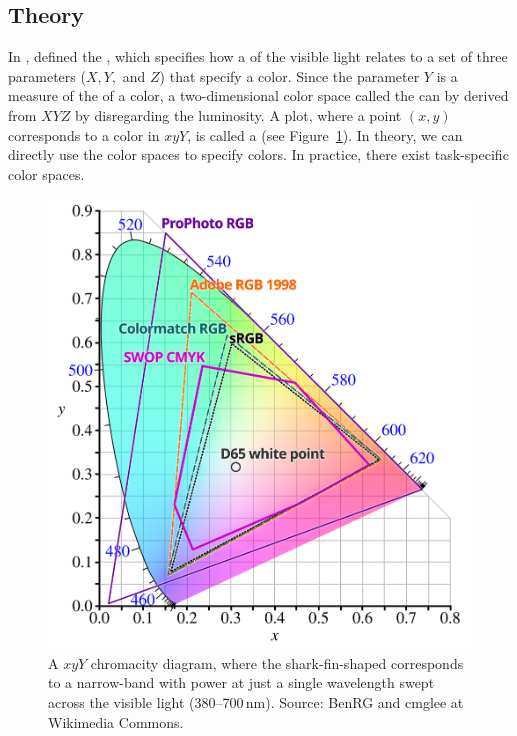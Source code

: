 \subsection{Theory}
In \citeyear{cie32},  defined the , which specifies how a
 of the visible light relates to a set of three parameters ($X,
Y,$ and $Z$) that specify a color. Since the parameter $Y$ is a measure of the
 of a color, a two-dimensional color space called the
 can by derived
from  $XYZ$ by disregarding the luminosity.
A plot, where a point $(x, y)$ corresponds to a color in  $xyY$,
is called a  (see Figure~\ref{fig:chromacity-diagram}).
In theory, we can directly use the  color spaces to specify
colors. In practice, there exist task-specific color spaces.

\begin{figure}
  \includegraphics[width=\textwidth]{examples/03/CIExy1931}
  \caption{A  $xyY$ chromacity diagram, where the shark-fin-shaped
    \protect{} corresponds to a narrow-band 
    with power at just a single wavelength swept across the visible light
    (380–700\,nm). Source: BenRG and cmglee at Wikimedia Commons.}
  \label{fig:chromacity-diagram}
\end{figure}

